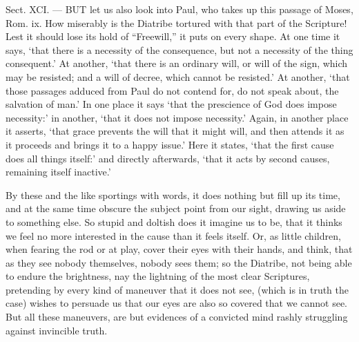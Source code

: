 Sect. XCI. — BUT let us also look into Paul, who takes up this passage of Moses, Rom. ix. How miserably is the Diatribe tortured with that part of the Scripture! Lest it should lose its hold of “Freewill,” it puts on every shape. At one time it says, ‘that there is a necessity of the consequence, but not a necessity of the thing consequent.’ At another, ‘that there is an ordinary will, or will of the sign, which may be resisted; and a will of decree, which cannot be resisted.’ At another, ‘that those passages adduced from Paul do not contend for, do not speak about, the salvation of man.’ In one place it says ‘that the prescience of God does impose necessity:’ in another, ‘that it does not impose necessity.’ Again, in another place it asserts, ‘that grace prevents the will that it might will, and then attends it as it proceeds and brings it to a happy issue.’ Here it states, ‘that the first cause does all things itself:’ and directly afterwards, ‘that it acts by second causes, remaining itself inactive.’

By these and the like sportings with words, it does nothing but fill up its time, and at the same time obscure the subject point from our sight, drawing us aside to something else. So stupid and doltish does it imagine us to be, that it thinks we feel no more interested in the cause than it feels itself. Or, as little children, when fearing the rod or at play, cover their eyes with their hands, and think, that as they see nobody themselves, nobody sees them; so the Diatribe, not being able to endure the brightness, nay the lightning of the most clear Scriptures, pretending by every kind of maneuver that it does not see, (which is in truth the case) wishes to persuade us that our eyes are also so covered that we cannot see. But all these maneuvers, are but evidences of a convicted mind rashly struggling against invincible truth.

